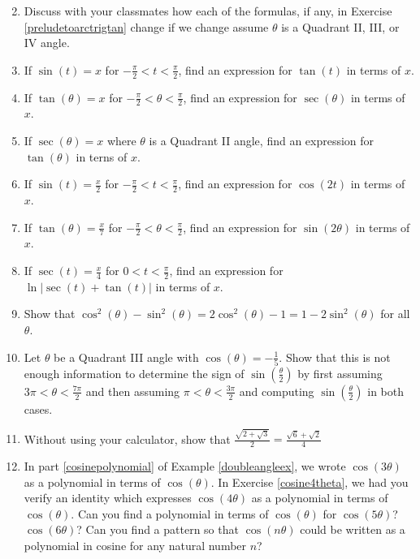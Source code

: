 \documentclass{ximera}
\begin{document}
\begin{enumerate}
\begin{multicols}{2}
\begin{enumerate}
\end{enumerate}

\end{multicols}

\item  Discuss with your classmates how each of the formulas, if any, in Exercise \ref{preludetoarctrigtan} change if we change assume $\theta$ is a Quadrant II, III, or IV angle.

\item  If $\sin(t) = x$ for  $-\frac{\pi}{2} < t < \frac{\pi}{2}$, find an expression for $\tan(t)$ in terms of $x$.

\item  If $\tan(\theta) = x$ for $-\frac{\pi}{2} < \theta < \frac{\pi}{2}$,  find an expression for $\sec(\theta)$ in terms of $x$.

\item  If $\sec(\theta) = x$ where  $\theta$ is a Quadrant II angle, find  an expression for $\tan(\theta)$ in terns of $x$.

\item If $\sin(t) = \frac{x}{2}$ for $-\frac{\pi}{2} < t < \frac{\pi}{2}$, find an expression for $\cos(2t)$ in terms of $x$.

\item If $\tan(\theta) = \frac{x}{7}$ for $-\frac{\pi}{2} < \theta < \frac{\pi}{2}$, find an expression for $\sin(2\theta)$ in terms of $x$.

\item If $\sec(t) = \frac{x}{4}$ for $0 < t < \frac{\pi}{2}$, find an expression for $\ln|\sec(t) + \tan(t)|$ in terms of $x$.

\item Show that $\cos^{2}(\theta) - \sin^{2}(\theta) = 2\cos^{2}(\theta) - 1 = 1 - 2\sin^{2}(\theta)$ for all $\theta$.

\item Let $\theta$ be a Quadrant III angle with $\cos(\theta) = -\frac{1}{5}$.  Show that this is not enough information to determine the sign of  $\sin\left(\frac{\theta}{2}\right)$ by first assuming $3\pi < \theta < \frac{7\pi}{2}$ and then assuming $\pi < \theta < \frac{3\pi}{2}$ and computing $\sin\left(\frac{\theta}{2}\right)$ in both cases.

\item Without using your calculator, show that $\frac{\sqrt{2 + \sqrt{3}}}{2} = \frac{\sqrt{6} + \sqrt{2}}{4}$

\item In part \ref{cosinepolynomial} of Example \ref{doubleangleex}, we wrote $\cos(3\theta)$ as a polynomial in terms of $\cos(\theta)$.  In Exercise \ref{cosine4theta}, we had you verify an identity which expresses $\cos(4\theta)$ as a polynomial in terms of $\cos(\theta)$.   Can you find a polynomial in terms of $\cos(\theta)$ for $\cos(5\theta)$?  $\cos(6\theta)$?  Can you find a pattern so that $\cos(n\theta)$ could be written as a polynomial in cosine for any natural number $n$?



\end{enumerate}
\end{document}
